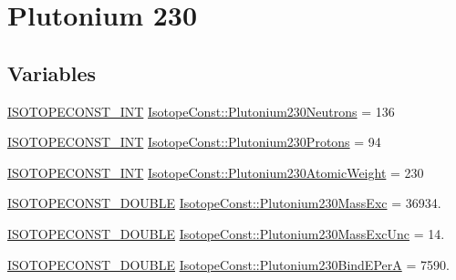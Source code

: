 \hypertarget{group___isotope_const-_plutonium-_pu230}{}\section{Plutonium 230}
\label{group___isotope_const-_plutonium-_pu230}
\subsection*{Variables}
\begin{DoxyCompactItemize}
\item 
\mbox{\hyperlink{group___isotope_const-_macros_ga5f18360b3e99483a35c32d789e62621c}{I\+S\+O\+T\+O\+P\+E\+C\+O\+N\+S\+T\+\_\+\+I\+NT}} \mbox{\hyperlink{group___isotope_const-_plutonium-_pu230_ga755effcb820c069e1fae4dcc7449efcd}{Isotope\+Const\+::\+Plutonium230\+Neutrons}} = 136
\item 
\mbox{\hyperlink{group___isotope_const-_macros_ga5f18360b3e99483a35c32d789e62621c}{I\+S\+O\+T\+O\+P\+E\+C\+O\+N\+S\+T\+\_\+\+I\+NT}} \mbox{\hyperlink{group___isotope_const-_plutonium-_pu230_ga59eb2bddd07e2ed48524d40b75cfa382}{Isotope\+Const\+::\+Plutonium230\+Protons}} = 94
\item 
\mbox{\hyperlink{group___isotope_const-_macros_ga5f18360b3e99483a35c32d789e62621c}{I\+S\+O\+T\+O\+P\+E\+C\+O\+N\+S\+T\+\_\+\+I\+NT}} \mbox{\hyperlink{group___isotope_const-_plutonium-_pu230_gab69f111c48c991b313814b9960d26840}{Isotope\+Const\+::\+Plutonium230\+Atomic\+Weight}} = 230
\item 
\mbox{\hyperlink{group___isotope_const-_macros_ga8f45a7272ce02c0b4c65c44636ed719a}{I\+S\+O\+T\+O\+P\+E\+C\+O\+N\+S\+T\+\_\+\+D\+O\+U\+B\+LE}} \mbox{\hyperlink{group___isotope_const-_plutonium-_pu230_ga4c363200604f0209339374c5243e689a}{Isotope\+Const\+::\+Plutonium230\+Mass\+Exc}} = 36934.
\item 
\mbox{\hyperlink{group___isotope_const-_macros_ga8f45a7272ce02c0b4c65c44636ed719a}{I\+S\+O\+T\+O\+P\+E\+C\+O\+N\+S\+T\+\_\+\+D\+O\+U\+B\+LE}} \mbox{\hyperlink{group___isotope_const-_plutonium-_pu230_ga9dd05c4243da00c29fd0de6a9fd42a92}{Isotope\+Const\+::\+Plutonium230\+Mass\+Exc\+Unc}} = 14.
\item 
\mbox{\hyperlink{group___isotope_const-_macros_ga8f45a7272ce02c0b4c65c44636ed719a}{I\+S\+O\+T\+O\+P\+E\+C\+O\+N\+S\+T\+\_\+\+D\+O\+U\+B\+LE}} \mbox{\hyperlink{group___isotope_const-_plutonium-_pu230_ga8b831aa1cf4ae974661d18bb4797aca0}{Isotope\+Const\+::\+Plutonium230\+Bind\+E\+PerA}} = 7590.
\item 

\end{DoxyCompactItemize}
